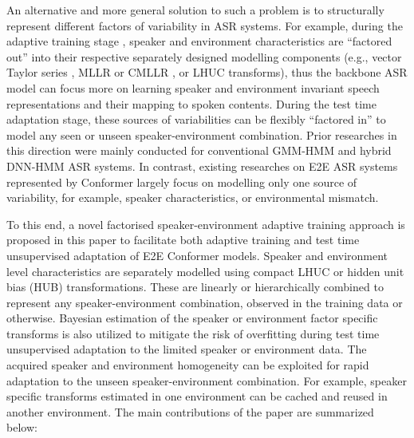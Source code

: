 \documentclass{INTERSPEECH2023}
\begin{document}
An alternative and more general solution to such a problem is to structurally represent different factors of variability in ASR systems\cite{gales2001acoustic,wang2013explicit,seltzer2012factored,fainberg2017factorised,kitza2019cumulative}. For example, during the adaptive training stage \cite{anastasakos1996compact,gales2001adaptive}, speaker and environment characteristics are “factored out” into their respective separately designed modelling components (e.g., vector Taylor series \cite{acero2000hmm}, MLLR or CMLLR \cite{leggetter1995maximum,gales1998maximum}, or LHUC \cite{Swietojanski2016LearningHU} transforms), thus the backbone ASR model can focus more on learning speaker and environment invariant speech representations and their mapping to spoken contents. During the test time adaptation stage, these sources of variabilities can be flexibly “factored in” to model any seen or unseen speaker-environment combination. Prior researches in this direction were mainly conducted for conventional GMM-HMM \cite{gales2001acoustic,seltzer2011separating,wang2012speaker,wang2013explicit,seltzer2012factored} and hybrid DNN-HMM \cite{fainberg2017factorised,kitza2019cumulative} ASR systems. In contrast, existing researches on E2E ASR systems represented by Conformer largely focus on modelling only one source of variability, for example, speaker characteristics\cite{tuske2021limit,zeineldeen2022conformer,zeineldeen2022improving,deng2023confidence}, or environmental mismatch\cite{chang2020end,zhang2021end,kumar2022end,sukhadia2023domain}. 

To this end, a novel factorised speaker-environment adaptive training approach is proposed in this paper to facilitate both adaptive training and test time unsupervised adaptation of E2E Conformer models. Speaker and environment level characteristics are separately modelled using compact LHUC \cite{Swietojanski2016LearningHU} or hidden unit bias (HUB) \cite{abdel2013fast,deng2023confidence} transformations. These are linearly or hierarchically combined to represent any speaker-environment combination, observed in the training data or otherwise. Bayesian estimation of the speaker or environment factor specific transforms is also utilized to mitigate the risk of overfitting during test time unsupervised adaptation to the limited speaker or environment data. The acquired speaker and environment homogeneity can be exploited for rapid adaptation to the unseen speaker-environment combination. For example, speaker specific transforms estimated in one environment can be cached and reused in another environment. The main contributions of the paper are summarized below: 
\end{document}
